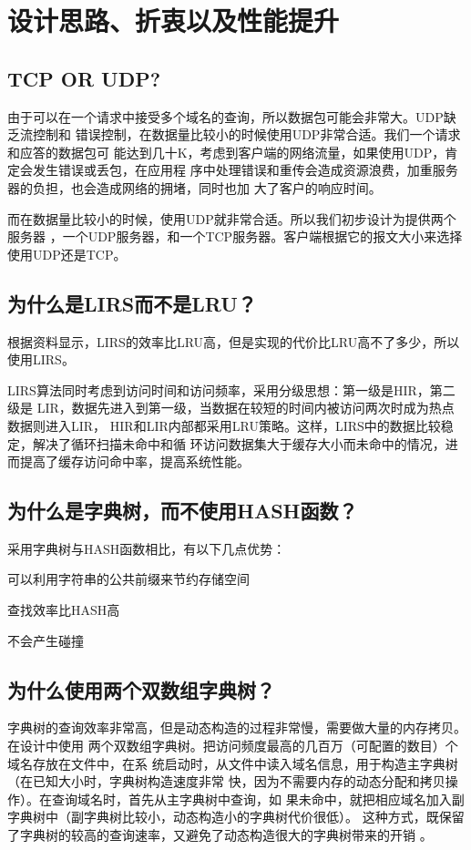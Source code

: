 %
%
\section{设计思路、折衷以及性能提升} 
\subsection{TCP OR UDP?}
由于可以在一个请求中接受多个域名的查询，所以数据包可能会非常大。UDP缺乏流控制和
错误控制，在数据量比较小的时候使用UDP非常合适。我们一个请求和应答的数据包可
能达到几十K，考虑到客户端的网络流量，如果使用UDP，肯定会发生错误或丢包，在应用程
序中处理错误和重传会造成资源浪费，加重服务器的负担，也会造成网络的拥堵，同时也加
大了客户的响应时间。
\par{而在数据量比较小的时候，使用UDP就非常合适。所以我们初步设计为提供两个服务器
，一个UDP服务器，和一个TCP服务器。客户端根据它的报文大小来选择使用UDP还是TCP。}
\subsection{为什么是LIRS而不是LRU？}
根据资料显示\cite{LIRS}，LIRS的效率比LRU高，但是实现的代价比LRU高不了多少，所以使用LIRS。
\par{LIRS算法同时考虑到访问时间和访问频率，采用分级思想：第一级是HIR，第二级是
LIR，数据先进入到第一级，当数据在较短的时间内被访问两次时成为热点数据则进入LIR，
HIR和LIR内部都采用LRU策略。这样，LIRS中的数据比较稳定，解决了循环扫描未命中和循
环访问数据集大于缓存大小而未命中的情况，进而提高了缓存访问命中率，提高系统性能。
}
\subsection{为什么是字典树，而不使用HASH函数？} 
采用字典树与HASH函数相比，有以下几点优势：
\begin{asparaenum}[1.]
\item{可以利用字符串的公共前缀来节约存储空间} 
\item{查找效率比HASH高\cite{DATA}}
\item{不会产生碰撞} 
\end{asparaenum}

\subsection{为什么使用两个双数组字典树？}
字典树的查询效率非常高，但是动态构造的过程非常慢，需要做大量的内存拷贝。在设计中使用
两个双数组字典树。把访问频度最高的几百万（可配置的数目）个域名存放在文件中，在系
统启动时，从文件中读入域名信息，用于构造主字典树（在已知大小时，字典树构造速度非常
快，因为不需要内存的动态分配和拷贝操作）。在查询域名时，首先从主字典树中查询，如
果未命中，就把相应域名加入副字典树中（副字典树比较小，动态构造小的字典树代价很低）。
这种方式，既保留了字典树的较高的查询速率，又避免了动态构造很大的字典树带来的开销
。

